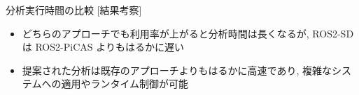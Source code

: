 \begin{frame}{分析実行時間の比較 [結果考察]}
    \begin{itemize}
        \item どちらのアプローチでも利用率が上がると分析時間は長くなるが, ROS2-SD は ROS2-PiCAS よりもはるかに遅い
        \item 提案された分析は既存のアプローチよりもはるかに高速であり, 複雑なシステムへの適用やランタイム制御が可能
    \end{itemize}
\end{frame}
